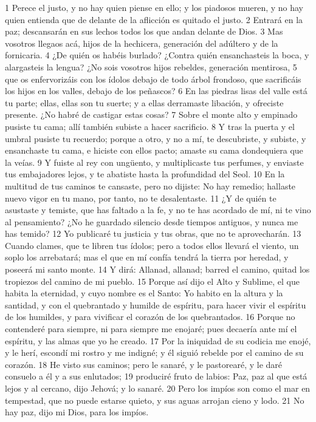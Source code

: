1 Perece el justo, y no hay quien piense en ello; y los piadosos mueren, y no hay quien entienda que de delante de la aflicción es quitado el justo.
2 Entrará en la paz; descansarán en sus lechos todos los que andan delante de Dios.
3 Mas vosotros llegaos acá, hijos de la hechicera, generación del adúltero y de la fornicaria.
4 ¿De quién os habéis burlado? ¿Contra quién ensanchasteis la boca, y alargasteis la lengua? ¿No sois vosotros hijos rebeldes, generación mentirosa,
5 que os enfervorizáis con los ídolos debajo de todo árbol frondoso, que sacrificáis los hijos en los valles, debajo de los peñascos?
6 En las piedras lisas del valle está tu parte; ellas, ellas son tu suerte; y a ellas derramaste libación, y ofreciste presente. ¿No habré de castigar estas cosas?
7 Sobre el monte alto y empinado pusiste tu cama; allí también subiste a hacer sacrificio.
8 Y tras la puerta y el umbral pusiste tu recuerdo; porque a otro, y no a mí, te descubriste, y subiste, y ensanchaste tu cama, e hiciste con ellos pacto; amaste su cama dondequiera que la veías.
9 Y fuiste al rey con ungüento, y multiplicaste tus perfumes, y enviaste tus embajadores lejos, y te abatiste hasta la profundidad del Seol.
10 En la multitud de tus caminos te cansaste, pero no dijiste: No hay remedio; hallaste nuevo vigor en tu mano, por tanto, no te desalentaste.
11 ¿Y de quién te asustaste y temiste, que has faltado a la fe, y no te has acordado de mí, ni te vino al pensamiento? ¿No he guardado silencio desde tiempos antiguos, y nunca me has temido?
12 Yo publicaré tu justicia y tus obras, que no te aprovecharán.
13 Cuando clames, que te libren tus ídolos; pero a todos ellos llevará el viento, un soplo los arrebatará; mas el que en mí confía tendrá la tierra por heredad, y poseerá mi santo monte.
14 Y dirá: Allanad, allanad; barred el camino, quitad los tropiezos del camino de mi pueblo.
15 Porque así dijo el Alto y Sublime, el que habita la eternidad, y cuyo nombre es el Santo: Yo habito en la altura y la santidad, y con el quebrantado y humilde de espíritu, para hacer vivir el espíritu de los humildes, y para vivificar el corazón de los quebrantados.
16 Porque no contenderé para siempre, ni para siempre me enojaré; pues decaería ante mí el espíritu, y las almas que yo he creado.
17 Por la iniquidad de su codicia me enojé, y le herí, escondí mi rostro y me indigné; y él siguió rebelde por el camino de su corazón.
18 He visto sus caminos; pero le sanaré, y le pastorearé, y le daré consuelo a él y a sus enlutados;
19 produciré fruto de labios: Paz, paz al que está lejos y al cercano, dijo Jehová; y lo sanaré.
20 Pero los impíos son como el mar en tempestad, que no puede estarse quieto, y sus aguas arrojan cieno y lodo.
21 No hay paz, dijo mi Dios, para los impíos. 


